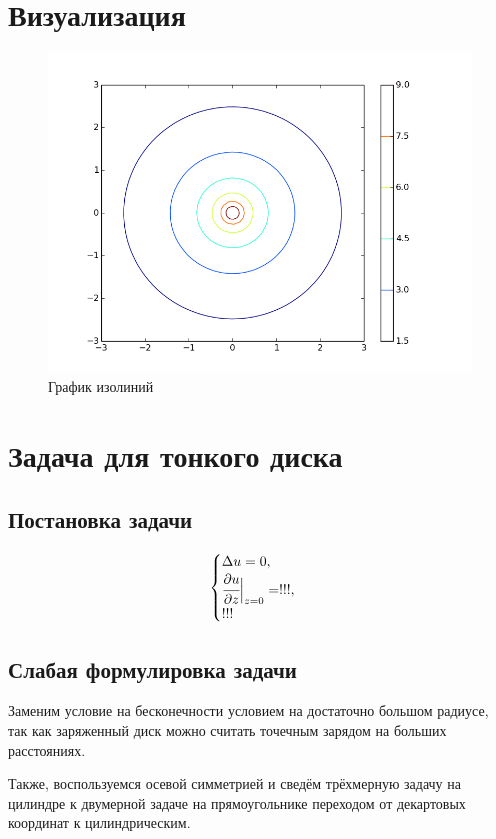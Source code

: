 \documentclass{report}
\begin{document}
\section{Визуализация}
\begin{figure}[h]
	\centering
	\includegraphics[scale=0.5]{contour.png}
	\caption{График изолиний}
\end{figure}

\section{Задача для тонкого диска}
\subsection{Постановка задачи}
\begin{equation}
	\begin{cases}
		\Delta u = 0,\\
		\cfrac{\partial u}{\partial z}\Bigr|_{z=0}=!!!,\\
		!!!
	\end{cases}
\end{equation}
\subsection{Слабая формулировка задачи}
Заменим условие на бесконечности условием на достаточно большом радиусе, так как заряженный диск можно считать точечным зарядом на больших расстояниях.

Также, воспользуемся осевой симметрией и сведём трёхмерную задачу на цилиндре к двумерной задаче на прямоугольнике переходом от декартовых координат к цилиндрическим.
\end{document}

